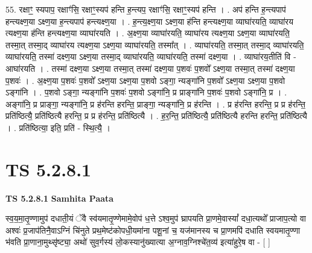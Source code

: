 \documentclass[17pt]{extarticle}
\begin{document}
55. रक्षाꣳ॒॒ स्यपाप॒ रक्षाꣳ॑सि॒ रक्षाꣳ॒॒स्यप॑ हन्ति ह॒न्त्यप॒ रक्षाꣳ॑सि॒ रक्षाꣳ॒॒स्यप॑ हन्ति । . अप॑ हन्ति ह॒न्त्यपाप॑ हन्त्यक्ष्ण॒या ऽक्ष्ण॒या ह॒न्त्यपाप॑ हन्त्यक्ष्ण॒या । . ह॒न्त्य॒क्ष्ण॒या ऽक्ष्ण॒या ह॑न्ति हन्त्यक्ष्ण॒या व्याघा॑रयति॒ व्याघा॑रय त्यक्ष्ण॒या ह॑न्ति हन्त्यक्ष्ण॒या व्याघा॑रयति । . अ॒क्ष्ण॒या व्याघा॑रयति॒ व्याघा॑रय त्यक्ष्ण॒या ऽक्ष्ण॒या व्याघा॑रयति॒ तस्मा॒त् तस्मा॒द् व्याघा॑रय त्यक्ष्ण॒या ऽक्ष्ण॒या व्याघा॑रयति॒ तस्मा᳚त् । . व्याघा॑रयति॒ तस्मा॒त् तस्मा॒द् व्याघा॑रयति॒ व्याघा॑रयति॒ तस्मा॑ दक्ष्ण॒या ऽक्ष्ण॒या तस्मा॒द् व्याघा॑रयति॒ व्याघा॑रयति॒ तस्मा॑ दक्ष्ण॒या । . व्याघा॑रय॒तीति॑ वि - आघा॑रयति । . तस्मा॑ दक्ष्ण॒या ऽक्ष्ण॒या तस्मा॒त् तस्मा॑ दक्ष्ण॒या प॒शवः॑ प॒शवो᳚ ऽक्ष्ण॒या तस्मा॒त् तस्मा॑ दक्ष्ण॒या प॒शवः॑ । . अ॒क्ष्ण॒या प॒शवः॑ प॒शवो᳚ ऽक्ष्ण॒या ऽक्ष्ण॒या प॒शवो ऽङ्गा॒ न्यङ्गा॑नि प॒शवो᳚ ऽक्ष्ण॒या ऽक्ष्ण॒या प॒शवो ऽङ्गा॑नि । . प॒शवो ऽङ्गा॒ न्यङ्गा॑नि प॒शवः॑ प॒शवो ऽङ्गा॑नि॒ प्र प्राङ्गा॑नि प॒शवः॑ प॒शवो ऽङ्गा॑नि॒ प्र । . अङ्गा॑नि॒ प्र प्राङ्गा॒ न्यङ्गा॑नि॒ प्र ह॑रन्ति हरन्ति॒ प्राङ्गा॒ न्यङ्गा॑नि॒ प्र ह॑रन्ति । . प्र ह॑रन्ति हरन्ति॒ प्र प्र ह॑रन्ति॒ प्रति॑ष्ठित्यै॒ प्रति॑ष्ठित्यै हरन्ति॒ प्र प्र ह॑रन्ति॒ प्रति॑ष्ठित्यै । . ह॒र॒न्ति॒ प्रति॑ष्ठित्यै॒ प्रति॑ष्ठित्यै हरन्ति हरन्ति॒ प्रति॑ष्ठित्यै । . प्रति॑ष्ठित्या॒ इति॒ प्रति॑ - स्थि॒त्यै॒ । \newline
\pagebreak
{}

\section{ TS 5.2.8.1 }

\textbf{TS 5.2.8.1 } \newline
\textbf{Samhita Paata} \newline

स्व॒य॒मा॒तृ॒ण्णामुप॑ दधाती॒यं ॅवै स्व॑यमातृ॒ण्णेमामे॒वोप॑ ध॒त्ते ऽश्व॒मुप॑ घ्रापयति प्रा॒णमे॒वास्यां᳚ दधा॒त्यथो᳚ प्राजाप॒त्यो वा अश्वः॑ प्र॒जाप॑तिनै॒वाऽग्निं चि॑नुते प्रथ॒मेष्ट॑कोपधी॒यमा॑ना पशू॒नां च॒ यज॑मानस्य च प्रा॒णमपि॑ दधाति स्वयमातृ॒ण्णा भ॑वति प्रा॒णाना॒मुथ्सृ॑ष्ट्या॒ अथो॑ सुव॒र्गस्य॑ लो॒कस्यानु॑ख्यात्या अ॒ग्नाव॒ग्निश्चे॑त॒व्य॑ इत्या॑हुरे॒ष वा - [  ] \newline
\end{document}
